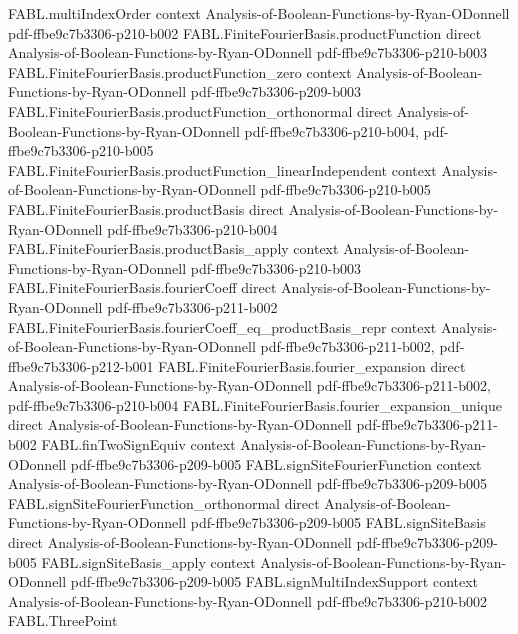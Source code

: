 \begin{theorem}
\proofstep
  {FABL.multiIndexOrder}
  {context}
  {Analysis-of-Boolean-Functions-by-Ryan-ODonnell}
  {pdf-ffbe9c7b3306-p210-b002}
\proofstep
  {FABL.FiniteFourierBasis.productFunction}
  {direct}
  {Analysis-of-Boolean-Functions-by-Ryan-ODonnell}
  {pdf-ffbe9c7b3306-p210-b003}
\proofstep
  {FABL.FiniteFourierBasis.productFunction_zero}
  {context}
  {Analysis-of-Boolean-Functions-by-Ryan-ODonnell}
  {pdf-ffbe9c7b3306-p209-b003}
\proofstep
  {FABL.FiniteFourierBasis.productFunction_orthonormal}
  {direct}
  {Analysis-of-Boolean-Functions-by-Ryan-ODonnell}
  {pdf-ffbe9c7b3306-p210-b004,
    pdf-ffbe9c7b3306-p210-b005}
\proofstep
  {FABL.FiniteFourierBasis.productFunction_linearIndependent}
  {context}
  {Analysis-of-Boolean-Functions-by-Ryan-ODonnell}
  {pdf-ffbe9c7b3306-p210-b005}
\proofstep
  {FABL.FiniteFourierBasis.productBasis}
  {direct}
  {Analysis-of-Boolean-Functions-by-Ryan-ODonnell}
  {pdf-ffbe9c7b3306-p210-b004}
\proofstep
  {FABL.FiniteFourierBasis.productBasis_apply}
  {context}
  {Analysis-of-Boolean-Functions-by-Ryan-ODonnell}
  {pdf-ffbe9c7b3306-p210-b003}
\proofstep
  {FABL.FiniteFourierBasis.fourierCoeff}
  {direct}
  {Analysis-of-Boolean-Functions-by-Ryan-ODonnell}
  {pdf-ffbe9c7b3306-p211-b002}
\proofstep
  {FABL.FiniteFourierBasis.fourierCoeff_eq_productBasis_repr}
  {context}
  {Analysis-of-Boolean-Functions-by-Ryan-ODonnell}
  {pdf-ffbe9c7b3306-p211-b002,
    pdf-ffbe9c7b3306-p212-b001}
\proofstep
  {FABL.FiniteFourierBasis.fourier_expansion}
  {direct}
  {Analysis-of-Boolean-Functions-by-Ryan-ODonnell}
  {pdf-ffbe9c7b3306-p211-b002,
    pdf-ffbe9c7b3306-p210-b004}
\proofstep
  {FABL.FiniteFourierBasis.fourier_expansion_unique}
  {direct}
  {Analysis-of-Boolean-Functions-by-Ryan-ODonnell}
  {pdf-ffbe9c7b3306-p211-b002}
\proofstep
  {FABL.finTwoSignEquiv}
  {context}
  {Analysis-of-Boolean-Functions-by-Ryan-ODonnell}
  {pdf-ffbe9c7b3306-p209-b005}
\proofstep
  {FABL.signSiteFourierFunction}
  {context}
  {Analysis-of-Boolean-Functions-by-Ryan-ODonnell}
  {pdf-ffbe9c7b3306-p209-b005}
\proofstep
  {FABL.signSiteFourierFunction_orthonormal}
  {direct}
  {Analysis-of-Boolean-Functions-by-Ryan-ODonnell}
  {pdf-ffbe9c7b3306-p209-b005}
\proofstep
  {FABL.signSiteBasis}
  {direct}
  {Analysis-of-Boolean-Functions-by-Ryan-ODonnell}
  {pdf-ffbe9c7b3306-p209-b005}
\proofstep
  {FABL.signSiteBasis_apply}
  {context}
  {Analysis-of-Boolean-Functions-by-Ryan-ODonnell}
  {pdf-ffbe9c7b3306-p209-b005}
\proofstep
  {FABL.signMultiIndexSupport}
  {context}
  {Analysis-of-Boolean-Functions-by-Ryan-ODonnell}
  {pdf-ffbe9c7b3306-p210-b002}
\proofstep
  {FABL.ThreePoint}

\end{theorem}
